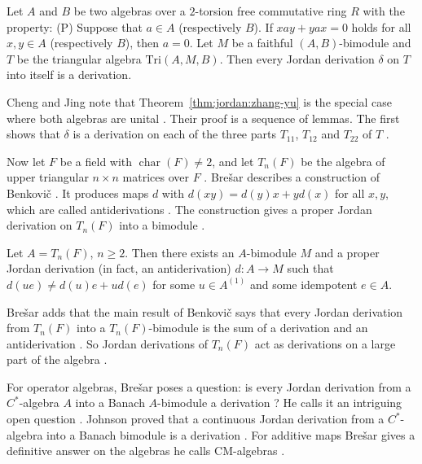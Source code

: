 \begin{theorem}\label{thm:jordan:cheng-jing}
Let $A$ and $B$ be two algebras over a $2$-torsion free commutative ring $R$ with the property:
(P) Suppose that $a\in A$ (respectively $B$). If $xay+yax=0$ holds for all $x,y\in A$ (respectively $B$),
then $a=0$. Let $M$ be a faithful $(A,B)$-bimodule and $T$ be the triangular algebra
$\mathrm{Tri}(A,M,B)$. Then every Jordan derivation $\delta$ on $T$ into itself is a derivation.
\end{theorem}

Cheng and Jing note that Theorem~\ref{thm:jordan:zhang-yu} is the special case
where both algebras are unital \cite[Remark~2.11, p.~5]{ChengJing2007}. Their
proof is a sequence of lemmas. The first shows that $\delta$ is a derivation
on each of the three parts $T_{11}$, $T_{12}$ and $T_{22}$ of $T$
\cite[pp.~4--5]{ChengJing2007}.

Now let $F$ be a field with $\operatorname{char}(F)\neq2$, and let $T_n(F)$ be
the algebra of upper triangular $n\times n$ matrices over $F$ \cite[Section~4,
p.~418]{Bresar2005}. Brešar describes a construction of Benkovič \cite[\S4.1,
p.~418]{Bresar2005}. It produces maps $d$ with $d(xy)=d(y)x+yd(x)$ for all
$x,y$, which are called antiderivations \cite[\S4.1, p.~418]{Bresar2005}. The
construction gives a proper Jordan derivation on $T_n(F)$ into a bimodule
\cite[\S4.1, p.~418]{Bresar2005}.

\begin{example}\label{ex:jordan:benkovic-tn}
Let $A=T_n(F)$, $n\geqslant2$. Then there exists an $A$-bimodule $M$ and a proper Jordan derivation
(in fact, an antiderivation) $d\colon A\to M$ such that $d(ue)\neq d(u)e+ud(e)$ for some
$u\in A^{(1)}$ and some idempotent $e\in A$.
\end{example}

Brešar adds that the main result of Benkovič says that every Jordan derivation
from $T_n(F)$ into a $T_n(F)$-bimodule is the sum of a derivation and an
antiderivation \cite[p.~419]{Bresar2005}. So Jordan derivations of $T_n(F)$
act as derivations on a large part of the algebra \cite[p.~419]{Bresar2005}.

For operator algebras, Brešar poses a question: is every Jordan derivation
from a $C^{*}$-algebra $A$ into a Banach $A$-bimodule a derivation
\cite[Section~5, p.~421]{Bresar2005}? He calls it an intriguing open question
\cite[Section~5, p.~421]{Bresar2005}. Johnson proved that a continuous Jordan
derivation from a $C^{*}$-algebra into a Banach bimodule is a derivation
\cite[p.~421]{Bresar2005}. For additive maps Brešar gives a definitive answer
on the algebras he calls $\mathrm{CM}$-algebras \cite[p.~421]{Bresar2005}.

